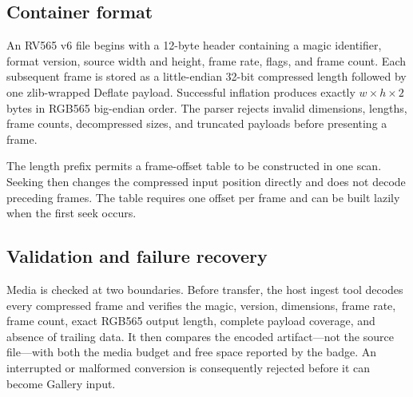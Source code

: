 \documentclass[11pt,twocolumn]{article}
\begin{document}
\subsection{Container format}

An RV565 v6 file begins with a 12-byte header containing a magic identifier,
format version, source width and height, frame rate, flags, and frame count.
Each subsequent frame is stored as a little-endian 32-bit compressed length
followed by one zlib-wrapped Deflate payload.  Successful inflation produces
exactly $w\times h\times2$ bytes in RGB565 big-endian order.  The parser rejects
invalid dimensions, lengths, frame counts, decompressed sizes, and truncated
payloads before presenting a frame.

\begin{table}[t]
\centering
\caption{RV565 v6 file layout. Multi-byte integers are little-endian; decoded
pixels are RGB565 big-endian.}
\label{tab:format}
\end{table}

The length prefix permits a frame-offset table to be constructed in one scan.
Seeking then changes the compressed input position directly and does not
decode preceding frames.  The table requires one offset per frame and can be
built lazily when the first seek occurs.

\subsection{Validation and failure recovery}

Media is checked at two boundaries.  Before transfer, the host ingest tool
decodes every compressed frame and verifies the magic, version, dimensions,
frame rate, frame count, exact RGB565 output length, complete payload coverage,
and absence of trailing data.  It then compares the encoded artifact---not the
source file---with both the media budget and free space reported by the badge.
An interrupted or malformed conversion is consequently rejected before it can
become Gallery input.
\end{document}
